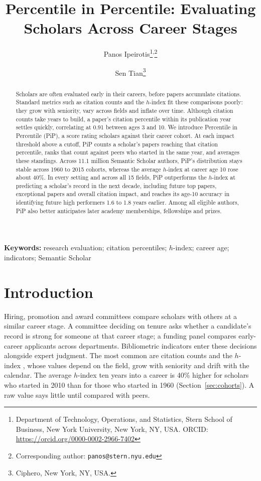 \documentclass[11pt]{article}
\title{Percentile in Percentile: Evaluating Scholars Across Career Stages}
\author{Panos Ipeirotis\thanks{Department of Technology, Operations, and Statistics, Stern School of Business, New York University, New York, NY, USA. ORCID: \url{https://orcid.org/0000-0002-2966-7402}}\textsuperscript{\kern3pt,\kern1pt}\thanks{Corresponding author: \texttt{panos@stern.nyu.edu}}
  \and Sen Tian\thanks{Ciphero, New York, NY, USA.}}
\date{}
\begin{document}
\maketitle

\begin{abstract}
\noindent
Scholars are often evaluated early in their careers, before papers accumulate citations. Standard metrics such as
citation counts and the $h$-index fit these comparisons poorly: they grow with seniority, vary across fields and
inflate over time. Although citation counts take years to build, a paper's citation percentile within its publication
year settles quickly, correlating at 0.91 between ages 3 and 10. We introduce Percentile in Percentile (PiP), a score
rating scholars against their career cohort. At each impact threshold above a cutoff, PiP counts a scholar's papers
reaching that citation percentile, ranks that count against peers who started in the same year, and averages these
standings. Across 11.1 million Semantic Scholar authors, PiP's distribution stays stable across 1960 to 2015 cohorts,
whereas the average $h$-index at career age 10 rose about 40\%. In every setting and across all 15 fields, PiP
outperforms the $h$-index at predicting a scholar's record in the next decade, including future top papers, exceptional
papers and overall citation impact, and reaches its age-10 accuracy in identifying future high performers 1.6 to 1.8
years earlier. Among all eligible authors, PiP also better anticipates later academy memberships, fellowships and
prizes.
\end{abstract}

\noindent\textbf{Keywords:} research evaluation; citation percentiles; $h$-index; career age; indicators; Semantic
Scholar

\section{Introduction}

Hiring, promotion and award committees compare scholars with others at a similar career stage. A committee deciding on
tenure asks whether a candidate's record is strong for someone at that career stage; a funding panel compares
early-career applicants across departments. Bibliometric indicators enter these decisions alongside expert judgment. The
most common are citation counts and the $h$-index \citep{hirsch2005index}, whose values depend on the field, grow with
seniority and drift with the calendar. The average $h$-index ten years into a career is 40\% higher for scholars who
started in 2010 than for those who started in 1960 (Section~\ref{sec:cohorts}). A raw value says little until compared
with peers.
\end{document}

